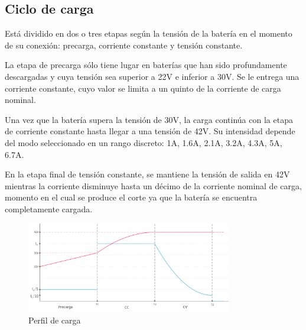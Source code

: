 \subsection{Ciclo de carga}

Está dividido en dos o tres etapas según la tensión de la batería en el momento de su conexión: precarga, corriente constante y tensión constante.

La etapa de precarga sólo tiene lugar en baterías que han sido profundamente descargadas y cuya tensión sea superior a 22V e inferior a 30V.
Se le entrega una corriente constante, cuyo valor se limita a un quinto de la corriente de carga nominal.

Una vez que la batería supera la tensión de 30V, la carga continúa con la etapa de corriente constante hasta llegar a una tensión de 42V.
Su intensidad depende del modo seleccionado en un rango discreto: 1A, 1.6A, 2.1A, 3.2A, 4.3A, 5A, 6.7A.

En la etapa final de tensión constante, se mantiene la tensión de salida en 42V mientras la corriente disminuye hasta un décimo de la corriente nominal de carga,
momento en el cual se produce el corte ya que la batería se encuentra completamente cargada. 

\begin{figure}[H]
    \centering
    \includegraphics[width=0.8\textwidth]{images/perfil_de_carga.png}
    \caption{Perfil de carga}
    \label{fig:perfil_de_carga}
\end{figure}
